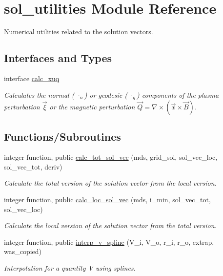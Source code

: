\hypertarget{namespacesol__utilities}{}\section{sol\+\_\+utilities Module Reference}
\label{namespacesol__utilities}


Numerical utilities related to the solution vectors.  


\subsection*{Interfaces and Types}
\begin{DoxyCompactItemize}
\item 
interface \hyperlink{interfacesol__utilities_1_1calc__xuq}{calc\+\_\+xuq}
\begin{DoxyCompactList}\small\item\em Calculates the normal ( $\cdot_n$) or geodesic ( $\cdot_g$) components of the plasma perturbation $\vec{\xi}$ or the magnetic perturbation $\vec{Q} = \nabla \times \left(\vec{x} \times \vec{B}\right)$. \end{DoxyCompactList}\end{DoxyCompactItemize}
\subsection*{Functions/\+Subroutines}
\begin{DoxyCompactItemize}
\item 
integer function, public \hyperlink{namespacesol__utilities_a8b902a82ae6a238e725da2cf09e7854f}{calc\+\_\+tot\+\_\+sol\+\_\+vec} (mds, grid\+\_\+sol, sol\+\_\+vec\+\_\+loc, sol\+\_\+vec\+\_\+tot, deriv)
\begin{DoxyCompactList}\small\item\em Calculate the total version of the solution vector from the local version. \end{DoxyCompactList}\item 
integer function, public \hyperlink{namespacesol__utilities_a677373f47ee68ad02e9cef5b409bdc26}{calc\+\_\+loc\+\_\+sol\+\_\+vec} (mds, i\+\_\+min, sol\+\_\+vec\+\_\+tot, sol\+\_\+vec\+\_\+loc)
\begin{DoxyCompactList}\small\item\em Calculate the local version of the solution vector from the total version. \end{DoxyCompactList}\item 
integer function, public \hyperlink{namespacesol__utilities_a93969085ad0fce8e530493a412b1ce38}{interp\+\_\+v\+\_\+spline} (V\+\_\+i, V\+\_\+o, r\+\_\+i, r\+\_\+o, extrap, was\+\_\+copied)
\begin{DoxyCompactList}\small\item\em Interpolation for a quantity V using splines. \end{DoxyCompactList}\end{DoxyCompactItemize}
